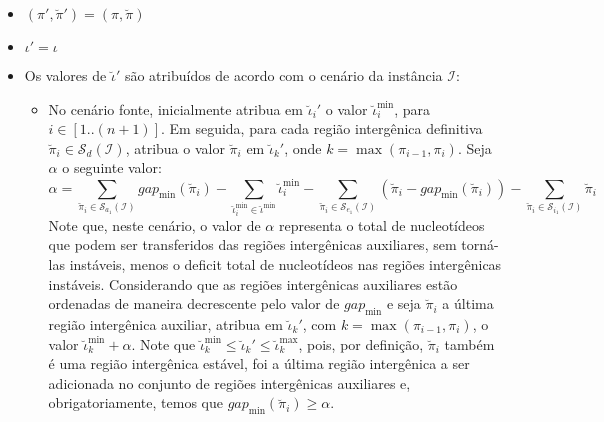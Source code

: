\begin{itemize}
  \item $(\pi',\breve\pi') = (\pi,\breve\pi)$
  \item $\iota' = \iota$
  \item Os valores de $\breve\iota'$ são atribuídos de acordo com o cenário da instância $\mathcal{I}$:
  \begin{itemize}
    \item No cenário fonte, inicialmente atribua em $\breve\iota_{i}'$ o valor $\breve\iota^{\min}_i$, para $i \in [1..({n+1})]$. Em seguida, para cada região intergênica definitiva $\breve\pi_i \in \mathcal{S}_{d}(\mathcal{I})$, atribua o valor $\breve\pi_i$ em $\breve\iota_{k}'$, onde $k = \max(\pi_{i-1},\pi_i)$. Seja $\alpha$ o seguinte valor:
    $$\alpha = \sum_{\breve\pi_i \in \mathcal{S}_{a_{1}}(\mathcal{I})} gap_{\min}(\breve\pi_i) - \sum_{\breve\iota_{i}^{\min}  \in \breve\iota^{\min}} \breve\iota_{i}^{\min} - \sum_{\breve\pi_i \in \mathcal{S}_{e_{1}}(\mathcal{I})} (\breve\pi_i - gap_{\min}(\breve\pi_i)) - \sum_{\breve\pi_i \in \mathcal{S}_{i_{1}}(\mathcal{I})} \breve\pi_i$$
    Note que, neste cenário, o valor de $\alpha$ representa o total de nucleotídeos que podem ser transferidos das regiões intergênicas auxiliares, sem torná-las instáveis, menos o deficit total de nucleotídeos nas regiões intergênicas instáveis. Considerando que as regiões intergênicas auxiliares estão ordenadas de maneira decrescente pelo valor de $gap_{\min}$ e seja $\breve\pi_i$ a última região intergênica auxiliar, atribua em $\breve\iota_{k}'$, com $k = \max(\pi_{i-1},\pi_i)$, o valor $\breve\iota^{\min}_k + \alpha$. Note que $\breve\iota^{\min}_k \le \breve\iota_{k}' \le \breve\iota^{\max}_k$, pois, por definição, $\breve\pi_i$ também é uma região intergênica estável, foi a última região intergênica a ser adicionada no conjunto de regiões intergênicas auxiliares e, obrigatoriamente, temos que $gap_{\min}(\breve\pi_i) \ge \alpha$.


\end{itemize}
\end{itemize}
